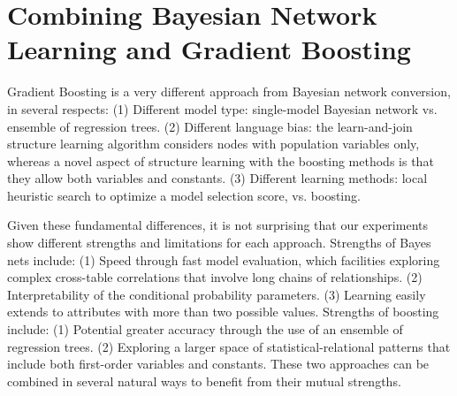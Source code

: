 \documentclass[runningheads,a4paper]{llncs}
\begin{document}

\section{Combining Bayesian Network Learning and Gradient Boosting} \label{sec:combine}

Gradient Boosting is a very different approach from Bayesian network conversion, in several respects: (1) Different model type: single-model Bayesian network vs. ensemble of regression trees. (2) Different language bias: the learn-and-join structure learning algorithm considers nodes with population variables only, whereas a novel aspect of structure learning with the boosting methods is that they allow both variables and constants. (3) Different learning methods: local heuristic search to optimize a model selection score, vs. boosting. 

Given these fundamental differences, it is not surprising that our experiments show different strengths and limitations for each approach. Strengths of Bayes nets include: (1) Speed through fast model evaluation, which facilities exploring complex cross-table correlations that involve long chains of relationships. (2) Interpretability of the conditional probability parameters. (3) Learning easily extends to attributes with more than two possible values.
Strengths of boosting include: (1) Potential greater accuracy through the use of an ensemble of regression trees. (2) Exploring a larger space of statistical-relational patterns that include both first-order variables and constants. 
These two approaches can be combined in several natural ways to benefit from their mutual strengths.
\end{document}

